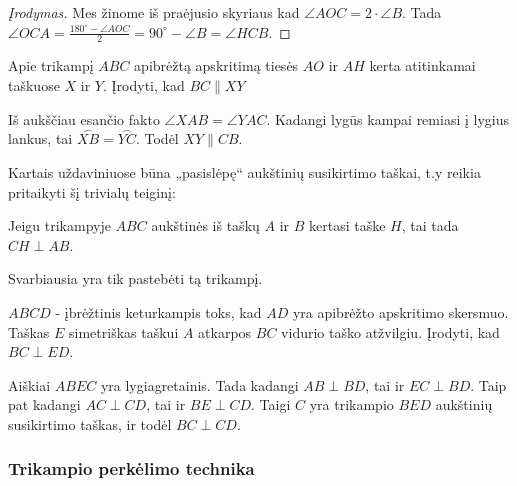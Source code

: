 \begin{proof}[Įrodymas]
  Mes žinome iš praėjusio skyriaus kad $\angle AOC =
  2\cdot\angle B$. Tada $\angle OCA = \frac{180^\circ-\angle
  AOC}{2} = 90^\circ-\angle B = \angle HCB$.
\end{proof}

\begin{pav}
  Apie trikampį $ABC$ apibrėžtą apskritimą tiesės $AO$ ir $AH$
  kerta atitinkamai taškuose $X$ ir $Y$. Įrodyti, kad
  $BC\parallel{XY}$ 
\end{pav}

\begin{sprendimas}
  Iš aukščiau esančio fakto $\angle XAB=\angle YAC$. Kadangi
  lygūs kampai remiasi į lygius lankus, tai $\stackrel\frown
  {XB}=\stackrel \frown {YC}$. Todėl $XY\parallel{CB}$.
\end{sprendimas}

Kartais uždaviniuose būna „pasislėpę“ aukštinių susikirtimo
taškai, t.y reikia pritaikyti šį trivialų teiginį:

\begin{teig}
  Jeigu trikampyje $ABC$ aukštinės iš taškų $A$ ir $B$
  kertasi taške $H$, tai tada $CH\perp{AB}$.
\end{teig} 

Svarbiausia yra tik pastebėti tą trikampį.

\begin{pav}
  $ABCD$ - įbrėžtinis keturkampis toks, kad $AD$ yra apibrėžto
  apskritimo skersmuo. Taškas $E$ simetriškas taškui $A$
  atkarpos $BC$ vidurio taško atžvilgiu. Įrodyti, kad
  $BC\perp{ED}$.
\end{pav}

\begin{sprendimas}
  Aiškiai $ABEC$ yra lygiagretainis. Tada kadangi
  $AB\perp{BD}$, tai ir $EC\perp{BD}$. Taip pat kadangi
  $AC\perp{CD}$, tai ir $BE\perp{CD}$. Taigi $C$ yra trikampio
  $BED$ aukštinių susikirtimo taškas, ir todėl $BC\perp{CD}$.
\end{sprendimas}

\subsubsection{Trikampio perkėlimo technika}


